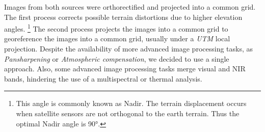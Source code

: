 Images from both sources were orthorectified and projected into a common grid. The first process corrects
possible terrain distortions due to higher elevation angles. \footnote{This angle is commonly known as Nadir.
The terrain displacement occurs when satellite sensors are not orthogonal to the earth terrain. Thus the optimal
Nadir angle is \ang{90}.} The second process projects the images into a common grid to georeference the images into 
a common grid, usually under a \textit{UTM} local projection. Despite the availability of more advanced image 
processing tasks, as \textit{Pansharpening} or \textit{Atmospheric compensation}, we decided to use a single approach. 
Also, some advanced image processing tasks merge visual and NIR bands, hindering the use of a multispectral 
or thermal analysis. 


